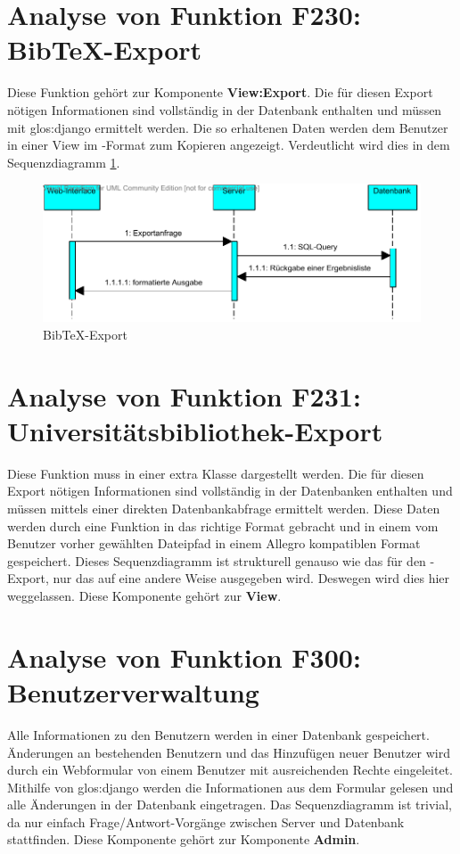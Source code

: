 \section{Analyse von Funktion F230: Bib\TeX -Export}
Diese Funktion gehört zur Komponente \textbf{View:Export}. Die für diesen Export nötigen Informationen sind vollständig in der Datenbank enthalten und müssen mit \gls{glos:django} ermittelt werden. Die so erhaltenen Daten werden dem Benutzer in einer View im \BibTeX -Format zum Kopieren angezeigt. Verdeutlicht wird dies in dem Sequenzdiagramm \ref{fig:BibTeX-Export}.

\begin{figure}[h]
\includegraphics[width=0.8\linewidth]{bilder/Seq-BibTex.pdf}
\caption[BibTeX-Export]{BibTeX-Export}
\label{fig:BibTeX-Export}
\end{figure}

\section{Analyse von Funktion F231: Universitätsbibliothek-Export}

Diese Funktion muss in einer extra Klasse dargestellt werden. Die für diesen Export nötigen Informationen sind vollständig in der Datenbanken enthalten und müssen mittels einer direkten Datenbankabfrage ermittelt werden. Diese Daten werden durch eine Funktion in das richtige Format gebracht und in einem vom Benutzer vorher gewählten Dateipfad in einem Allegro kompatiblen Format gespeichert. Dieses Sequenzdiagramm ist strukturell genauso wie das für den \BibTeX -Export, nur das auf eine andere Weise ausgegeben wird. Deswegen wird dies hier weggelassen. Diese Komponente gehört zur \textbf{View}.


\section{Analyse von Funktion F300: Benutzerverwaltung}
Alle Informationen zu den Benutzern werden in einer Datenbank gespeichert. Änderungen an bestehenden Benutzern und das Hinzufügen neuer Benutzer wird durch ein Webformular von einem Benutzer mit ausreichenden Rechte eingeleitet. Mithilfe von \gls{glos:django} werden die Informationen aus dem Formular gelesen und alle Änderungen in der Datenbank eingetragen. Das Sequenzdiagramm ist trivial, da nur einfach Frage/Antwort-Vorgänge zwischen Server und Datenbank stattfinden. Diese Komponente gehört zur Komponente \textbf{Admin}.

